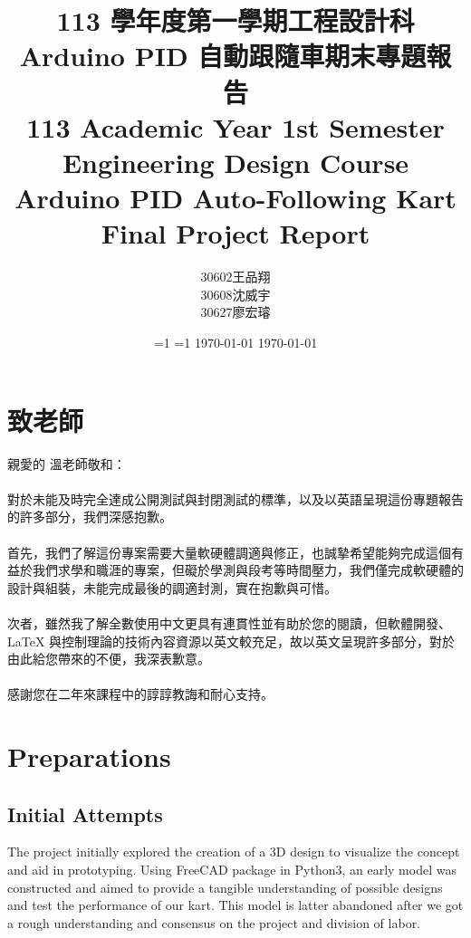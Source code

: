 \documentclass[a4paper,12pt]{article}
\newcounter{xeCJK}
\newcounter{ZhRenew}
\renewcommand{\maketitle}{
\begin{titlepage}
\begin{center}
\vspace*{\fill}
{\huge \bfseries \thetitle\par}
\vskip 1.5em
{\Large \theauthor\par}
\vskip 1em
{\large \thedate\par}
\vspace*{\fill}
\end{center}
\end{titlepage}
}
\begin{document}
\title{
\Large 113 學年度第一學期工程設計科\\
\huge Arduino PID 自動跟隨車期末專題報告\\
\Large 113 Academic Year 1st Semester Engineering Design Course\\
\huge Arduino PID Auto-Following Kart Final Project Report
}
\author{30602王品翔\\30608沈威宇\\30627廖宏璿}
\date{
\ifnum\value{xeCJK}=1
\ifnum\value{ZhRenew}=1
\zhtoday
\else\today
\fi
\else
\today
\fi
}
\onehalfspacing
\thispagestyle{empty}\nth\maketitle\setcounter{page}{1}
\nth\tableofcontents
\nthm\setcounter{page}{1}
\section{致老師}
親愛的 溫老師敬和：\\\\
對於未能及時完全達成公開測試與封閉測試的標準，以及以英語呈現這份專題報告的許多部分，我們深感抱歉。\\\\
首先，我們了解這份專案需要大量軟硬體調適與修正，也誠摯希望能夠完成這個有益於我們求學和職涯的專案，但礙於學測與段考等時間壓力，我們僅完成軟硬體的設計與組裝，未能完成最後的調適封測，實在抱歉與可惜。\\\\
次者，雖然我了解全數使用中文更具有連貫性並有助於您的閱讀，但軟體開發、\LaTeX{} 與控制理論的技術內容資源以英文較充足，故以英文呈現許多部分，對於由此給您帶來的不便，我深表歉意。\\\\
感謝您在二年來課程中的諄諄教誨和耐心支持。
\nthm\section{Preparations}
\subsection{Initial Attempts}
The project initially explored the creation of a 3D design to visualize the concept and aid in prototyping. Using FreeCAD package in Python3, an early model was constructed and aimed to provide a tangible understanding of possible designs and test the performance of our kart. This model is latter abandoned after we got a rough understanding and consensus on the project and division of labor.
\end{document}
